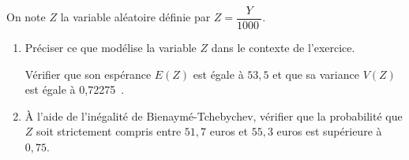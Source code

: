 \documentclass[10pt]{article}
\providecommand{\np}[2][]{{#2~#1}}
\begin{document}
On note $Z$ la variable aléatoire définie par $Z = \dfrac{Y}{\np{1000}}$.

\begin{enumerate}[resume]
\item Préciser ce que modélise la variable $Z$ dans le contexte de l'exercice.

Vérifier que son espérance $E(Z)$ est égale à $53,5$ et que sa variance $V(Z)$ est égale à \np{0,72275}.
\item À l'aide de l'inégalité de Bienaymé-Tchebychev, vérifier que la probabilité que $Z$ soit strictement compris entre $51,7$ euros et $55,3$ euros est supérieure à $0,75$.
\end{enumerate}

\bigskip
\end{document}

